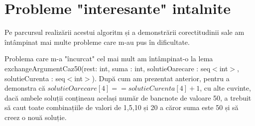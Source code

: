\section{Probleme "interesante" intalnite}
Pe parcursul realizării acestui algoritm și a demonstrării corectitudinii sale am întâmpinat mai multe probleme care m-au pus în dificultate. \par  
Problema care m-a "încurcat" cel mai mult am întâmpinat-o la lema exchangeArgumentCaz50(rest: int, suma : int, solutieOarecare : seq$<$int$>$, solutieCurenta : seq$<$int$>$). După cum am prezentat anterior, pentru a demonstra că $solutieOarecare[4] == solutieCurenta[4] + 1$, cu alte cuvinte, dacă ambele soluții conțineau același număr de bancnote de valoare 50, a trebuit să caut toate combinațiile de valori de 1,5,10 și 20 a căror suma este 50 și să creez o nouă soluție. \par 
